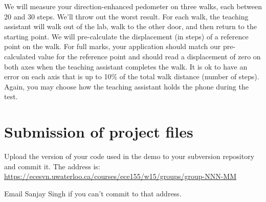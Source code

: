 \documentclass[10pt]{article}
\begin{document}
We will measure your direction-enhanced pedometer on three walks, each between 20 and 30 steps. We'll throw out the worst result. For each walk, the teaching assistant will walk out of the lab, walk to the other door, and then return to the starting point. We will pre-calculate the displacement (in steps) of a reference point on the walk. For full marks, your application should match our pre-calculated value for the reference point and should read a displacement of zero on both axes when the teaching assistant completes the walk. It is ok to have an error on each axis that is up to 10\% of the total walk distance (number of steps). Again, you may choose how the teaching assistant holds the phone during the test.

\section{Submission of project files}

Upload the version of your code used in the demo to your subversion repository and commit it. The address is:
\url{https://ecesvn.uwaterloo.ca/courses/ece155/w15/groups/group-NNN-MM}

Email Sanjay Singh if you can't commit to that address.
\end{document}
